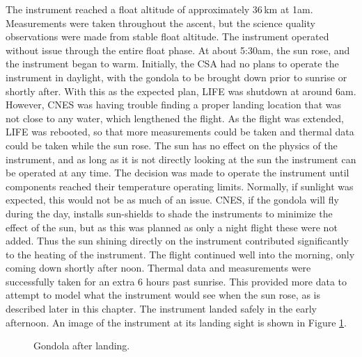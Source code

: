 The instrument reached a float altitude of approximately 36\,km at 1am. Measurements were taken throughout the ascent, but the science quality observations were made from stable float altitude. The instrument operated without issue through the entire float phase. At about 5:30am, the sun rose, and the instrument began to warm. Initially, the CSA had no plans to operate the instrument in daylight, with the gondola to be brought down prior to sunrise or shortly after. With this as the expected plan, LIFE was shutdown at around 6am. However, CNES was having trouble finding a proper landing location that was not close to any water, which lengthened the flight. As the flight was extended, LIFE was rebooted, so that more measurements could be taken and thermal data could be taken while the sun rose. The sun has no effect on the physics of the instrument, and as long as it is not directly looking at the sun the instrument can be operated at any time. The decision was made to operate the instrument until components reached their temperature operating limits. Normally, if sunlight was expected, this would not be as much of an issue. CNES, if the gondola will fly during the day, installs sun-shields to shade the instruments to minimize the effect of the sun, but as this was planned as only a night flight these were not added. Thus the sun shining directly on the instrument contributed significantly to the heating of the instrument. The flight continued well into the morning, only coming down shortly after noon. Thermal data and measurements were successfully taken for an extra 6 hours past sunrise. This provided more data to attempt to model what the instrument would see when the sun rose, as is described later in this chapter. The instrument landed safely in the early afternoon. An image of the instrument at its landing sight is shown in Figure \ref{fig:gondola_after_landing}. 

\begin{figure}
    \centering
    \caption{Gondola after landing.}
    \label{fig:gondola_after_landing}
\end{figure}

